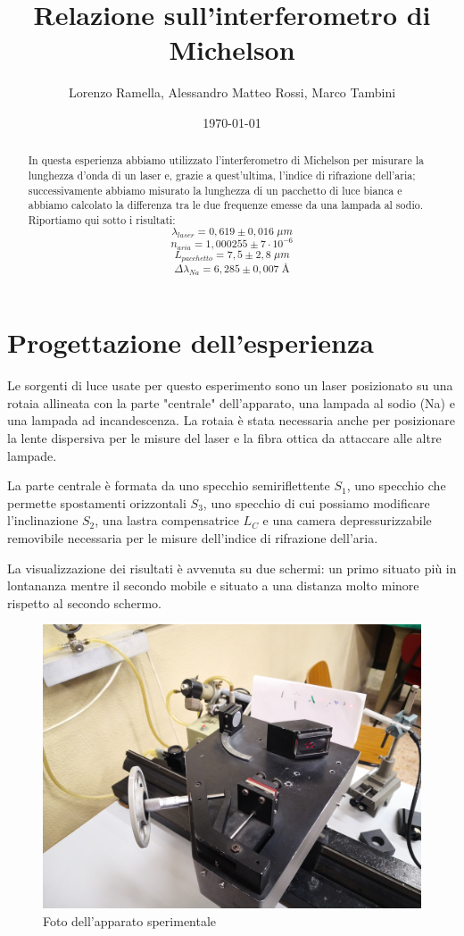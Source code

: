 \documentclass{article}
\title{Relazione sull'interferometro di Michelson}
\author{Lorenzo Ramella, Alessandro Matteo Rossi, Marco Tambini}
\date{\today}
\begin{document}
\maketitle

\begingroup
{}
\begin{abstract}
In questa esperienza abbiamo utilizzato l'interferometro di Michelson per misurare la lunghezza d'onda di un laser e, grazie a quest'ultima, l'indice di rifrazione dell'aria; successivamente abbiamo misurato la lunghezza di un pacchetto di luce bianca e abbiamo calcolato la differenza tra le due frequenze emesse da una lampada al sodio.
Riportiamo qui sotto i risultati:
\[ \lambda_{laser} = 0,619 \pm 0,016 \; \mu m \]
\[ n_{aria} = 1,000255 \pm 7 \cdot 10^{-6} \]
\[ L_{pacchetto} = 7,5 \pm 2,8 \; \mu m \]
\[ \Delta \lambda_{Na} = 6,285 \pm 0,007 \; \textrm{Å} \]
\end{abstract}
\endgroup

\tableofcontents



\section{Progettazione dell'esperienza}
Le sorgenti di luce usate per questo esperimento sono un laser posizionato su una rotaia allineata con la parte "centrale" dell'apparato, una lampada al sodio (Na) e una lampada ad incandescenza. La rotaia è stata necessaria anche per posizionare la lente dispersiva per le misure del laser e la fibra ottica da attaccare alle altre lampade.

La parte centrale è formata da uno specchio semiriflettente $S_1$, uno specchio che permette spostamenti orizzontali $S_3$, uno specchio di cui possiamo modificare l'inclinazione $S_2$, una lastra compensatrice $L_C$ e una camera depressurizzabile removibile necessaria per le misure dell'indice di rifrazione dell'aria. 

La visualizzazione dei risultati è avvenuta su due schermi: un primo situato più in lontananza mentre il secondo mobile e situato a una distanza molto minore rispetto al secondo schermo.

\begin{figure}[h!]
  \centering
  \includegraphics[width=0.5\linewidth]{IM strumentazione}
  \caption{Foto dell'apparato sperimentale}
\end{figure}
\end{document}
